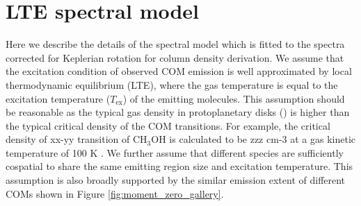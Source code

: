 \documentclass[linenumbers, twocolumn, twocolappendix, astrosymb, times]{aastex631}
\newcommand{\methanol}{CH$_3$OH\xspace}
\begin{document}
\section{LTE spectral model}\label{appendix:spectral_model}
Here we describe the details of the spectral model which is fitted to the spectra corrected for Keplerian rotation for column density derivation. We assume that the excitation condition of observed COM emission is well approximated by local thermodynamic equilibrium (LTE), where the gas temperature is equal to the excitation temperature ($T_\mathrm{ex}$) of the emitting molecules. This assumption should be reasonable as the typical gas density in protoplanetary disks () is higher than the typical critical density of the COM transitions. For example, the critical density of xx-yy transition of \methanol is calculated to be zzz cm-3 at a gas kinetic temperature of 100 K \citep[ref][]{}. We further assume that different species are sufficiently cospatial to share the same emitting region size and excitation temperature. This assumption is also broadly supported by the similar emission extent of different COMs shown in Figure \ref{fig:moment_zero_gallery}. 
\end{document}

